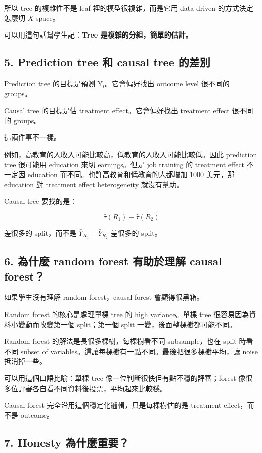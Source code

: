 \documentclass[
  chinese,
  11pt,
]{article}
\begin{document}
所以 tree 的複雜性不是 leaf 裡的模型很複雜，而是它用 data-driven
的方式決定怎麼切 \(X\)-space。

可以用這句話幫學生記：\textbf{Tree 是複雜的分組，簡單的估計。}

\subsection{5. Prediction tree 和 causal tree
的差別}\label{prediction-tree-ux548c-causal-tree-ux7684ux5deeux5225}

Prediction tree 的目標是預測 \(\mathrm{Y}_i\)。它會偏好找出 outcome
level 很不同的 groups。

Causal tree 的目標是估 treatment effect。它會偏好找出 treatment effect
很不同的 groups。

這兩件事不一樣。

例如，高教育的人收入可能比較高，低教育的人收入可能比較低。因此
prediction tree 很可能用 education 來切 earnings。但是 job training 的
treatment effect 不一定因 education 而不同。也許高教育和低教育的人都增加
1000 美元，那 education 對 treatment effect heterogeneity 就沒有幫助。

Causal tree 要找的是：

\[
\hat{\tau}(R_1)-\hat{\tau}(R_2)
\]

差很多的 split，而不是 \(\bar{Y}_{R_1}-\bar{Y}_{R_2}\) 差很多的 split。

\subsection{6. 為什麼 random forest 有助於理解 causal
forest？}\label{ux70baux4ec0ux9ebc-random-forest-ux6709ux52a9ux65bcux7406ux89e3-causal-forest}

如果學生沒有理解 random forest，causal forest 會顯得很黑箱。

Random forest 的核心是處理單棵 tree 的 high variance。單棵 tree
很容易因為資料小變動而改變第一個 split；第一個 split
一變，後面整棵樹都可能不同。

Random forest 的解法是長很多棵樹，每棵樹看不同 subsample，也在 split
時看不同 subset of
variables。這讓每棵樹有一點不同。最後把很多棵樹平均，讓 noise
抵消掉一些。

可以用這個口語比喻：單棵 tree 像一位判斷很快但有點不穩的評審；forest
像很多位評審各自看不同資料後投票，平均起來比較穩。

Causal forest 完全沿用這個穩定化邏輯，只是每棵樹估的是 treatment
effect，而不是 outcome。

\subsection{7. Honesty
為什麼重要？}\label{honesty-ux70baux4ec0ux9ebcux91cdux8981}
\end{document}
